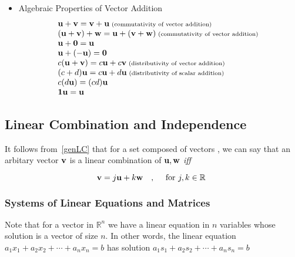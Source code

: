 \documentclass[english,course]{Notes}
\newcommand{\real}{\mathbb{R}}
\newcommand{\ita}[1]{\textit{#1}}
\begin{document}
\begin{itemize}
\item []Algebraic Properties of Vector Addition
$$\begin{array}{l}{\mathbf{u}+\mathbf{v}=\mathbf{v}+\mathbf{u} \scriptsize\text { (commutativity of vector addition) }} \\ {(\mathbf{u}+\mathbf{v})+\mathbf{w}=\mathbf{u}+(\mathbf{v}+\mathbf{w}) \scriptsize\text { (commutativity of vector addition) }} \\ {\mathbf{u}+\mathbf{0}=\mathbf{u}} \\ {\mathbf{u}+(-\mathbf{u})=\mathbf{0}} \\ {c(\mathbf{u}+\mathbf{v})=c \mathbf{u}+c \mathbf{v} \scriptsize\text { (distributivity of vector addition) }} \\ {(c+d) \mathbf{u}=c \mathbf{u}+d \mathbf{u} \scriptsize\text { (distributivity of scalar addition) }} \\ {c(d \mathbf{u})=(c d) \mathbf{u}} \\ {\mathbf{1} \mathbf{u}=\mathbf{u}}\end{array}
$$\end{itemize}

\subsection{Linear Combination and Independence}


\par{It follows from~\ref{genLC} that for a set composed of vectors , we can say that an arbitary vector $\mathbf{v}$ is a linear combination of $\mathbf{u} , \mathbf{w}$ \ita{iff}}

$$ \vc{v} = j\vc{u} + k\vc{w} \quad , \quad \text{ for } j, k \in \real~\label{lc}$$

\subsubsection{Systems of Linear Equations and Matrices}

\par{Note that for a vector in $\real^{n}$ we have a linear equation in $n$ variables whose solution is  a vector of size $n$. In other words, the linear equation $a_{1} x_{1}+a_{2} x_{2}+\cdots + a_{n} x_{n}=b$ has solution $a_{1} s_{1}+a_{2} s_{2}+\cdots +a_{n} s_{n}=b$}
\end{document}

